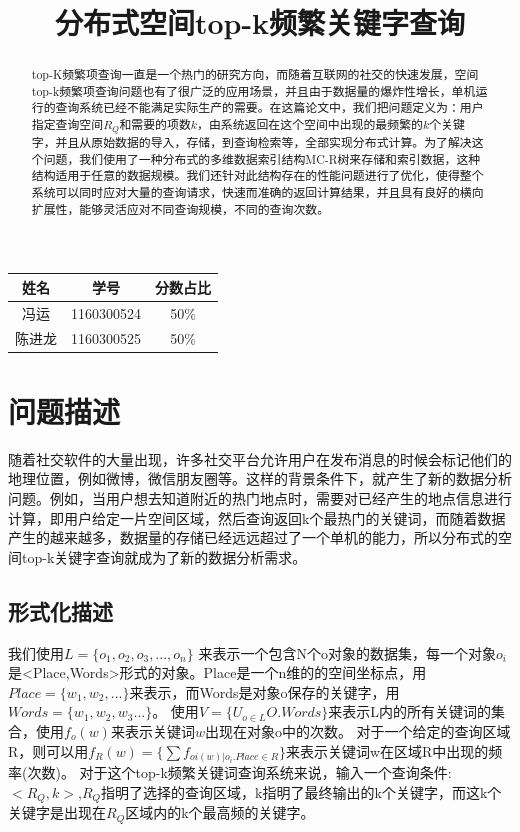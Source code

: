 \documentclass{elegantpaper}
\title{分布式空间top-k频繁关键字查询}
\begin{document}
\maketitle

\begin{table}[!htbp]
    \centering
    \begin{tabular}{ccc}
    姓名&学号&分数占比\\
    \hline
    冯运&1160300524&50\%\\
    陈进龙&1160300525&50\%\\
    \end{tabular}
\end{table}

\begin{abstract}
    top-K频繁项查询一直是一个热门的研究方向，而随着互联网的社交的快速发展，空间top-k频繁项查询问题也有了很广泛的应用场景，并且由于数据量的爆炸性增长，单机运行的查询系统已经不能满足实际生产的需要。在这篇论文中，我们把问题定义为：用户指定查询空间$R_Q$和需要的项数$k$，由系统返回在这个空间中出现的最频繁的$k$个关键字，并且从原始数据的导入，存储，到查询检索等，全部实现分布式计算。为了解决这个问题，我们使用了一种分布式的多维数据索引结构MC-R树来存储和索引数据，这种结构适用于任意的数据规模。我们还针对此结构存在的性能问题进行了优化，使得整个系统可以同时应对大量的查询请求，快速而准确的返回计算结果，并且具有良好的横向扩展性，能够灵活应对不同查询规模，不同的查询次数。
\end{abstract}

\section{问题描述}

随着社交软件的大量出现，许多社交平台允许用户在发布消息的时候会标记他们的地理位置，例如微博，微信朋友圈等。这样的背景条件下，就产生了新的数据分析问题。例如，当用户想去知道附近的热门地点时，需要对已经产生的地点信息进行计算，即用户给定一片空间区域，然后查询返回k个最热门的关键词，而随着数据产生的越来越多，数据量的存储已经远远超过了一个单机的能力，所以分布式的空间top-k关键字查询就成为了新的数据分析需求。

\subsection{形式化描述}
我们使用$L=\{o_1,o_2,o_3,...,o_n\} $ 来表示一个包含N个o对象的数据集，每一个对象$o_i$是<Place,Words>形式的对象。Place是一个n维的的空间坐标点，用$Place=\{w_1,w_2,...\}$来表示，而Words是对象o保存的关键字，用$Words=\{w_1,w_2,w_3... \}$。\newline
使用$V=\{U_{o\in L}O.Words\}$来表示L内的所有关键词的集合，使用$f_o(w)$来表示关键词$w$出现在对象o中的次数。\newline
对于一个给定的查询区域R，则可以用$f_R(w)=\{\sum{f_{oi(w)|o_i.Place\in R}} \}$来表示关键词w在区域R中出现的频率(次数)。\newline
对于这个top-k频繁关键词查询系统来说，输入一个查询条件:$<R_Q,k>$,$R_Q$指明了选择的查询区域，k指明了最终输出的k个关键字，而这k个关键字是出现在$R_Q$区域内的k个最高频的关键字。\newline
\end{document}
